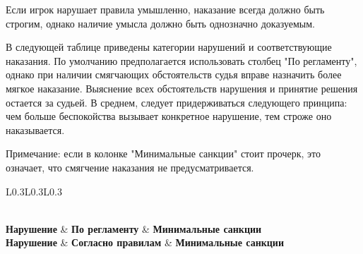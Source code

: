 Если игрок нарушает правила умышленно, наказание всегда должно быть строгим, однако наличие умысла должно быть однозначно доказуемым.

В следующей таблице приведены категории нарушений и соответствующие наказания. По умолчанию предполагается использовать столбец "По регламенту", однако при наличии смягчающих обстоятельств судья вправе назначить более мягкое наказание. Выяснение всех обстоятельств нарушения и принятие решения остается за судьей. В среднем, следует придерживаться следующего принципа: чем больше беспокойства вызывает конкретное нарушение, тем строже оно наказывается.

Примечание: если в колонке "Минимальные санкции" стоит прочерк, это означает, что смягчение наказания не предусматривается.

\noindent\begin{tabularx}{\linewidth}{L{0.3\linewidth}L{0.3\linewidth}L{0.3\linewidth}}
	\caption{Обоснования штрафов} \\
	\toprule
	\textbf{Нарушение} & \textbf{По регламенту} & \textbf{Минимальные санкции} \\
	\endfirsthead
	\toprule
	\textbf{Нарушение} & \textbf{Согласно правилам} & \textbf{Минимальные санкции} \\
	\midrule
	\endhead
	\endfoot
	\bottomrule
	\endlastfoot


\end{tabularx}
